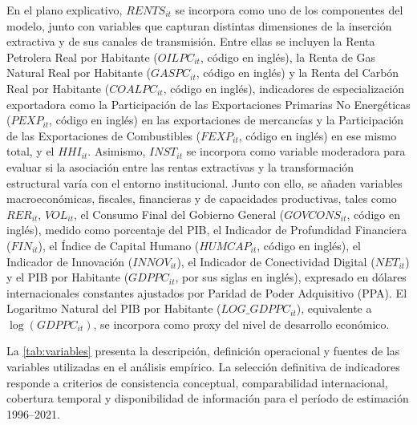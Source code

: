 \documentclass[../../TFM.tex]{subfiles}
\begin{document}
En el plano explicativo, $RENTS_{it}$ se incorpora como uno de los componentes
del modelo, junto con variables que capturan distintas dimensiones de la
inserción extractiva y de sus canales de transmisión. Entre ellas se incluyen
la Renta Petrolera Real por Habitante ($OILPC_{it}$, código en inglés), la Renta de Gas Natural
Real por Habitante ($GASPC_{it}$, código en inglés) y la Renta del Carbón Real por Habitante
($COALPC_{it}$, código en inglés), indicadores de especialización exportadora como la
Participación de las Exportaciones Primarias No Energéticas ($PEXP_{it}$, código en inglés)
en las exportaciones de mercancías y la Participación de las Exportaciones
de Combustibles ($FEXP_{it}$, código en inglés) en ese mismo total, y el $HHI_{it}$.
Asimismo, $INST_{it}$ se incorpora como
variable moderadora para evaluar si la asociación entre las rentas extractivas
y la transformación estructural varía con el entorno institucional.
Junto con ello, se añaden variables macroeconómicas, fiscales, financieras
y de capacidades productivas, tales como $RER_{it}$,
$VOL_{it}$, el Consumo Final del Gobierno General ($GOVCONS_{it}$, código en inglés),
medido como porcentaje del PIB, el Indicador de Profundidad Financiera ($FIN_{it}$), el Índice de Capital Humano
($HUMCAP_{it}$, código en inglés), el Indicador de Innovación ($INNOV_{it}$), el Indicador de Conectividad Digital
($NET_{it}$) y el PIB por Habitante ($GDPPC_{it}$, por sus siglas en inglés),
expresado en dólares internacionales constantes ajustados por Paridad de Poder
Adquisitivo (PPA). El Logaritmo Natural del PIB por Habitante
($LOG\_GDPPC_{it}$), equivalente a $\log(GDPPC_{it})$, se incorpora como
proxy del nivel de desarrollo económico.

La \autoref{tab:variables} presenta la descripción, definición
operacional y fuentes de las variables utilizadas en el análisis
empírico. La selección definitiva de indicadores responde a criterios de
	consistencia conceptual, comparabilidad internacional, cobertura temporal
	y disponibilidad de información para el período de estimación 1996--2021.
	\renewcommand{\arraystretch}{1.2}
	\setlength{\tabcolsep}{4pt}
	\small
\end{document}
